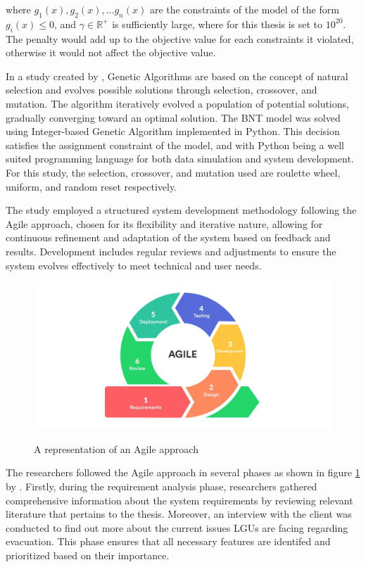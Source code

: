 \documentclass[12pt,a4paper,]{article}
\begin{document}
	where $g_1(x),g_2(x),...g_n(x)$ are the constraints of the model of the form $g_i(x)\le0$, and $\gamma\in\mathbb{R}^+$ is sufficiently large, where for this thesis is set to $10^{20}$. The penalty would add up to the objective value for each constraints it violated, otherwise it would not affect the objective value.	
	
	In a study created by \textcite{Mathew2012}, Genetic Algorithms are based on the concept of natural selection and evolves possible solutions through selection, crossover, and mutation. The algorithm iteratively evolved a population of potential solutions, gradually converging toward an optimal solution. The BNT model was solved using Integer-based Genetic Algorithm implemented in Python. This decision satisfies the assignment constraint of the model, and with Python being a well suited programming language for both data simulation and system development. For this study, the selection, crossover, and mutation used are roulette wheel, uniform, and random reset respectively.
	
	The study employed a structured system development methodology following the Agile approach, chosen for its flexibility and iterative nature, allowing for continuous refinement and adaptation of the system based on feedback and results. Development includes regular reviews and adjustments to ensure the system evolves effectively to meet technical and user needs. 
	
	\begin{figure}[h!]
		\caption{A representation of an Agile approach}
		\centering
		\includegraphics[width=\columnwidth]{AGILE}
		\label{Agile}
	\end{figure}
	
	The researchers followed the Agile approach in several phases as shown in figure \ref{Agile} by \textcite{Jayathilaka2020}. Firstly, during the requirement analysis phase, researchers gathered comprehensive information about the system requirements by reviewing relevant literature that pertains to the thesis. Moreover, an interview with the client was conducted to find out more about the current issues LGUs are facing regarding evacuation. This phase ensures that all necessary features are identifed and prioritized based on their importance.
	
\end{document}
